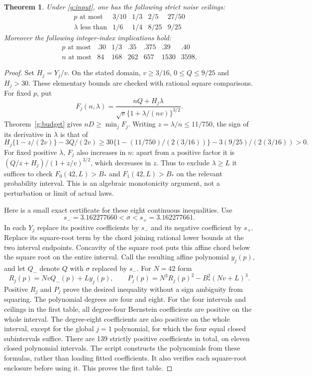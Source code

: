 \documentclass[11pt]{article}
\newtheorem{theorem}{Theorem}\newtheorem{lemma}[theorem]{Lemma}
\begin{document}
\begin{theorem}\label{g:ceiling}
Under \eqref{g:input}, one has the following strict noise ceilings:
\[
\begin{array}{c|cccc}
 p\text{ at most}&3/10&1/3&2/5&27/50\\\hline
 \lambda\text{ less than}&1/6&1/4&8/25&9/25
\end{array}
\]
Moreover the following integer-index implications hold:
\[
\begin{array}{c|rrrrrr}
 p\text{ at most}&.30&1/3&.35&.375&.39&.40\\\hline
 n\text{ at most}&84&168&262&657&1530&3598.
\end{array}
\]
\end{theorem}
\begin{proof}
Set $H_j=Y_j/v$. On the stated domain,
$v\ge3/16$, $0\le Q\le9/25$ and $H_j>30$.
These elementary bounds are checked with rational square comparisons.
For fixed $p$, put
\[
 F_j(n,\lambda)=
 \frac{nQ+H_j\lambda}{\sqrt v\{1+\lambda/(nv)\}^{3/2}}.
\]
Theorem~\ref{g:budget} gives $nD\ge\min_jF_j$.
Writing $z=\lambda/n\le11/750$, the sign of its derivative in
$\lambda$ is that of
\[
 H_j\{1-z/(2v)\}-3Q/(2v)
 \ge30\{1-(11/750)/(2(3/16))\}
               -3(9/25)/(2(3/16))>0.
\]
For fixed positive $\lambda$, $F_j$ also increases in $n$:
apart from a positive factor it is
$(Q/z+H_j)/(1+z/v)^{3/2}$, which decreases in $z$.
Thus to exclude $\lambda\ge L$ it suffices to check
$F_0(42,L)>B_*$ and $F_1(42,L)>B_*$ on the relevant probability
interval. This is an algebraic monotonicity argument, not a perturbation
or limit of actual laws.

Here is a small exact certificate for these eight continuous inequalities.
Use
\[s_-=3.162277660<\sigma<s_+=3.162277661.\]
In each $Y_j$ replace its positive coefficients by $s_-$ and its negative
coefficient by $s_+$. Replace its square-root term by the chord joining
rational lower bounds at the two interval endpoints. Concavity of the
square root puts this affine chord below the square root on the entire
interval. Call the resulting affine polynomial $y_j(p)$, and let $Q_-$
denote $Q$ with $\sigma$ replaced by $s_-$.
For $N=42$ form
\[
 R_j(p)=NvQ_-(p)+Ly_j(p),\qquad
 P_j(p)=N^3R_j(p)^2-B_*^2(Nv+L)^3.
\]
Positive $R_j$ and $P_j$ prove the desired inequality without a sign
ambiguity from squaring. The polynomial degrees are four and eight.
For the four intervals and ceilings in the first table, all degree-four
Bernstein coefficients are positive on the whole interval. The degree-eight
coefficients are also positive on the whole interval, except for the global
$j=1$ polynomial, for which the four equal closed subintervals suffice.
There are 139 strictly positive coefficients in total, on eleven closed
polynomial intervals. The script constructs the polynomials from these
formulas, rather than loading fitted coefficients. It also verifies each
square-root enclosure before using it. This proves the first table.


\end{proof}
\end{document}
